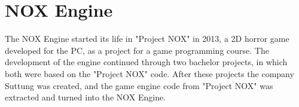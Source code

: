 \section{NOX Engine}
The NOX Engine started its life in "Project NOX" in 2013,
a 2D horror game developed for the PC, as a project for a game programming course.
The development of the engine continued through two bachelor projects,
in which both were based on the "Project NOX" code.
After these projects the company Suttung was created, and the game engine
code from "Project NOX" was extracted and turned into the NOX Engine.
